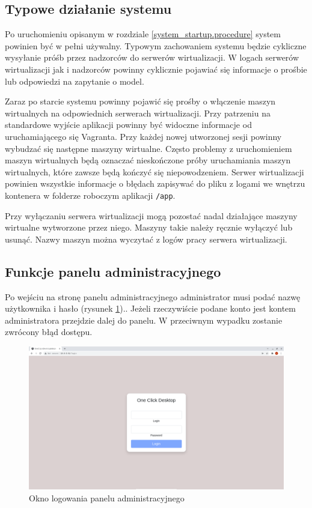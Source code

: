 \documentclass[../opis-rozwiazania.tex]{subfiles}
\begin{document}
\label{system_interaction}

\subsection{Typowe działanie systemu}
Po uruchomieniu opisanym w rozdziale \ref{system_startup.procedure} system powinien być w pełni używalny.
Typowym zachowaniem systemu będzie cykliczne wysyłanie próśb przez nadzorców do serwerów wirtualizacji.
W logach serwerów wirtualizacji jak i nadzorców powinny cyklicznie pojawiać się informacje o prośbie lub odpowiedzi na zapytanie o model.

Zaraz po starcie systemu powinny pojawić się prośby o włączenie maszyn wirtualnych na odpowiednich serwerach wirtualizacji.
Przy patrzeniu na standardowe wyjście aplikacji powinny być widoczne informacje od uruchamiającego się Vagranta.
Przy każdej nowej utworzonej sesji powinny wybudzać się następne maszyny wirtualne.
Często problemy z uruchomieniem maszyn wirtualnych będą oznaczać nieskończone próby uruchamiania maszyn wirtualnych, które zawsze będą kończyć się niepowodzeniem.
Serwer wirtualizacji powinien wszystkie informacje o błędach zapisywać do pliku z logami we wnętrzu kontenera w folderze roboczym aplikacji \texttt{/app}.

Przy wyłączaniu serwera wirtualizacji mogą pozostać nadal działające maszyny wirtualne wytworzone przez niego.
Maszyny takie należy ręcznie wyłączyć lub usunąć.
Nazwy maszyn można wyczytać z logów pracy serwera wirtualizacji.

\subsection{Funkcje panelu administracyjnego}

Po wejściu na stronę panelu administracyjnego administrator musi podać nazwę użytkownika i hasło (rysunek \ref{figure:system_interaction.admin.login})..
Jeżeli rzeczywiście podane konto jest kontem administratora przejdzie dalej do panelu.
W przeciwnym wypadku zostanie zwrócony błąd dostępu.

\begin{figure}[h!]
  \centering
  \includegraphics[width=\textwidth]{resources/admin_panel_login.png}
  \caption{Okno logowania panelu administracyjnego}
  \label{figure:system_interaction.admin.login}
\end{figure}
\end{document}
